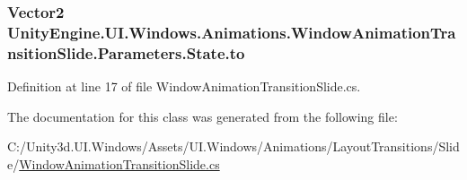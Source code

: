 \subsubsection[{to}]{\setlength{\rightskip}{0pt plus 5cm}Vector2 Unity\+Engine.\+U\+I.\+Windows.\+Animations.\+Window\+Animation\+Transition\+Slide.\+Parameters.\+State.\+to}\label{class_unity_engine_1_1_u_i_1_1_windows_1_1_animations_1_1_window_animation_transition_slide_1_1_parameters_1_1_state_a578fc34fb06c6507a0a95411b7a120ed}


Definition at line 17 of file Window\+Animation\+Transition\+Slide.\+cs.



The documentation for this class was generated from the following file\+:\begin{DoxyCompactItemize}
\item 
C\+:/\+Unity3d.\+U\+I.\+Windows/\+Assets/\+U\+I.\+Windows/\+Animations/\+Layout\+Transitions/\+Slide/\hyperlink{_window_animation_transition_slide_8cs}{Window\+Animation\+Transition\+Slide.\+cs}\end{DoxyCompactItemize}

